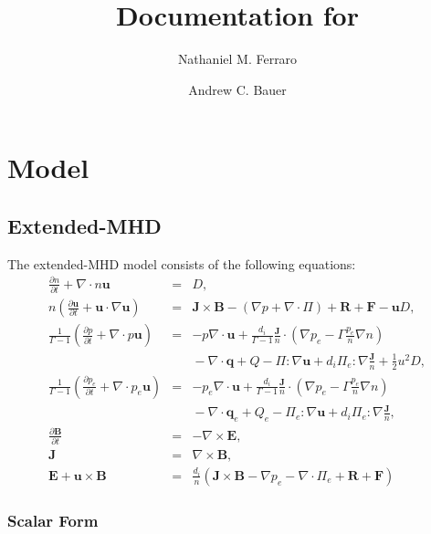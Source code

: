 \documentclass[letterpaper]{book}
\title{Documentation for \codename}
\author{Nathaniel M. Ferraro \and Andrew C. Bauer}
\newcommand{\ddt}[1]{\frac{\partial #1}{\partial t}}
\renewcommand{\vec}[1]{\ensuremath{\mathbf{#1}}}
\newcommand{\tensor}[1]{\mathsf{#1}}
\newcommand{\B}{\vec{B}}
\newcommand{\E}{\vec{E}}
\newcommand{\R}{\vec{R}}
\renewcommand{\u}{\vec{u}}
\newcommand{\F}{\vec{F}}
\renewcommand{\j}{\vec{J}}
\newcommand{\q}{\vec{q}}
\newcommand{\jn}{\frac{\j}{n}}
\renewcommand{\P}{\tensor{\Pi}}
\renewcommand{\div}[1]{\nabla \cdot #1}
\newcommand{\curl}[1]{\nabla \times #1}
\newcommand{\dotdot}{:}
\begin{document}
\maketitle

\tableofcontents




\chapter{Model}

\section{Extended-MHD}

The extended-MHD model consists of the following equations:
\begin{subequations} \label{eq:xmhd}
\begin{eqnarray}
  \label{eq:continuity}
  \ddt{n} + \div n \u & = & D,
  \\
  \label{eq:momentum}
  n \left( \ddt{\u} + \u \cdot \nabla \u \right) 
  & = & \j \times \B - (\nabla p + \div \P) + \R + \F - \u D,
  \\
  \frac{1}{\Gamma-1} \left( \ddt{p} + \div{p\u} \right)
  & = & -p \div\u +
  \frac{d_i}{\Gamma-1}\jn\cdot\left(\nabla p_e -
  \Gamma \frac{p_e}{n}\nabla n \right)
  \\ & & \mbox{}
  - \div{\q} + Q - \P\dotdot\nabla \u + d_i \P_e\dotdot\nabla \jn + \frac{1}{2} u^2 D,
  \nonumber \\
  \frac{1}{\Gamma-1} \left( \ddt{p_e} + \div{p_e\u} \right)
  & = & -p_e \div\u +
  \frac{d_i}{\Gamma-1}\jn\cdot\left(\nabla p_e -
  \Gamma \frac{p_e}{n}\nabla n \right)
  \\ & & \mbox{} 
  - \div{\q_e} + Q_e - \P_e\dotdot\nabla \u + d_i \P_e\dotdot\nabla \jn,
  \nonumber 
  \\
  \label{eq:Faraday}
  \ddt{\B} & = & -\curl \E,
  \\
  \j & = &\curl \B,
  \\
  \label{eq:ohm}
  \E + \u \times \B & = &  
  \frac{d_i}{n} \left(\j\times\B - \nabla p_e 
  - \div{\P_e} + \R + \F \right)
\end{eqnarray}
\end{subequations}


\subsection{Scalar Form}
\end{document}
